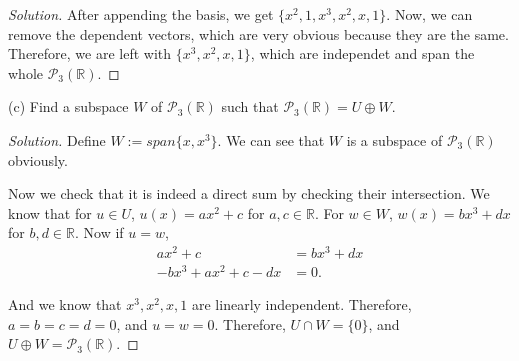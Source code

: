 \documentclass{article}
\begin{document}
\begin{description}
\begin{proof}[Solution]
        After appending the basis, we get $\{x^2, 1, x^3, x^2, x, 1\}$. Now, we can remove the 
        dependent vectors, which are very obvious because they are the same. Therefore, we are left 
        with $\{x^3, x^2, x, 1\}$, which are independet and span the whole ${\mathcal P}_3(\mathbb{R})$.
    \end{proof}

    \item{(c)} Find a subspace $W$ of ${\mathcal P}_3(\mathbb{R})$ such that 
    ${\mathcal P}_3(\mathbb{R}) = U \oplus W$.
    \begin{proof}[Solution]
        Define $W:=span\{x, x^3\}$. We can see that $W$ is a subspace of ${\mathcal P}_3(\mathbb{R})$
        obviously. 

        Now we check that it is indeed a direct sum by checking their intersection. We know that 
        for $u\in U$, $u(x)=ax^2+c$ for $a,c\in\mathbb{R}$. For $w\in W$, $w(x)=bx^3+dx$ for $b,d 
        \in \mathbb{R}$. Now if $u = w$, 
        \begin{align*}
            ax^2+c & = bx^3+dx \\ 
            -bx^3+ax^2+c-dx & = 0.
        \end{align*}

        And we know that $x^3, x^2, x, 1$ are linearly independent. Therefore, $a=b=c=d=0$, and 
        $u=w=0$. Therefore, $U\cap W = \{0\}$, and $U\oplus W = {\mathcal P}_3
        (\mathbb{R})$.
    \end{proof}
\end{description}

\newpage
\end{document}
